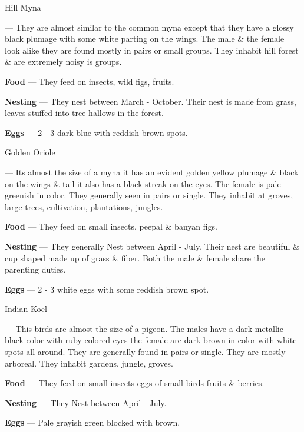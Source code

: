 \begin{bird}{Hill Myna}

 --- They are almost similar to the common myna except that they have a glossy black plumage with some white parting on the wings. The male \& the female look alike they are found mostly in pairs or small groups. They inhabit hill forest \& are extremely noisy is groups. 

{\large\bf Food} --- They feed on insects, wild figs, fruits.

{\large\bf Nesting} --- They nest between March - October. Their nest is made from grass, leaves stuffed into tree hallows in the forest.

{\large\bf Eggs} --- 2 - 3 dark blue with reddish brown spots.
\end{bird}

\begin{bird}{Golden Oriole}

 --- Its almost the size of a myna it has an evident golden yellow plumage \& black on the wings \& tail it also has a black streak on the eyes. The female is pale greenish in color. They generally seen in pairs or single. They inhabit at groves, large trees, cultivation, plantations, jungles.

{\large\bf Food} --- They feed on small insects, peepal \& banyan figs.

{\large\bf Nesting} --- They generally Nest between April - July. Their nest are beautiful \& cup shaped made up of grass \& fiber. Both the male \& female share the parenting duties.

{\large\bf Eggs} --- 2 - 3 white eggs with some reddish brown spot.
\end{bird}

\begin{bird}{Indian Koel}

 --- This birds are almost the size of a pigeon. The males have a dark metallic black color with ruby colored eyes the female are dark brown in color with white spots all around. They are generally found in pairs or single. They are mostly arboreal. They inhabit gardens, jungle, groves.

{\large\bf Food} --- They feed on small insects eggs of small birds fruits \& berries. 

{\bf Nesting} --- They Nest between April - July.

{\bf Eggs} --- Pale grayish green blocked with brown.
\end{bird}

